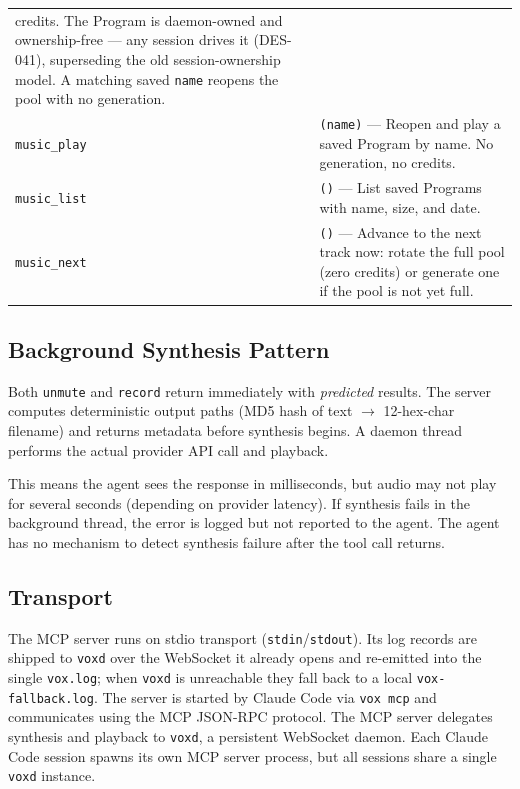 \documentclass[a4paper,10pt]{article}
\newcommand{\tool}[1]{\texttt{#1}}
\newcommand{\field}[1]{\texttt{#1}}
\begin{document}
\begin{center}
\begin{longtable}{lp{8.5cm}}
  credits.  The Program is daemon-owned and ownership-free --- any
  session drives it (DES-041), superseding the old session-ownership
  model.  A matching saved \field{name} reopens the pool with no
  generation. \\
\tool{music\_play} & \texttt{(name)} --- Reopen and play a saved Program
  by name.  No generation, no credits. \\
\tool{music\_list} & \texttt{()} --- List saved Programs with name, size,
  and date. \\
\tool{music\_next} & \texttt{()} --- Advance to the next track now: rotate
  the full pool (zero credits) or generate one if the pool is not yet
  full. \\
\bottomrule
\end{longtable}
\end{center}

\subsection{Background Synthesis Pattern}

Both \tool{unmute} and \tool{record} return immediately with
\emph{predicted} results.  The server computes deterministic output
paths (MD5 hash of text $\to$ 12-hex-char filename) and returns
metadata before synthesis begins.  A daemon thread performs the
actual provider API call and playback.

This means the agent sees the response in milliseconds, but audio
may not play for several seconds (depending on provider latency).
If synthesis fails in the background thread, the error is logged
but not reported to the agent.  The agent has no mechanism to
detect synthesis failure after the tool call returns.

\subsection{Transport}

The MCP server runs on stdio transport (\texttt{stdin}/\texttt{stdout}).
Its log records are shipped to \texttt{voxd} over the WebSocket it already
opens and re-emitted into the single \texttt{vox.log}; when \texttt{voxd} is
unreachable they fall back to a local \texttt{vox-fallback.log}.  The server is
started by Claude Code via
\texttt{vox mcp} and communicates using the MCP JSON-RPC protocol.
The MCP server delegates synthesis and playback to
\texttt{voxd}, a persistent WebSocket daemon.  Each Claude Code
session spawns its own MCP server process, but all sessions
share a single \texttt{voxd} instance.
\end{document}
